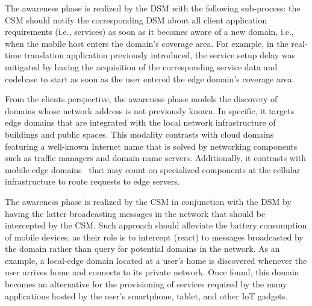The awareness phase is realized by the DSM with the following sub-process: the CSM should notify the corresponding DSM about all client application requirements (i.e., services) as soon as it becomes aware of a new domain, i.e., when the mobile host enters the domain's coverage area. For example, in the real-time translation application previously introduced, the service setup delay was mitigated by having the acquisition of the corresponding service data and codebase to start as soon as the user entered the edge domain's coverage area.

From the clients perspective, the awareness phase models the discovery of domains whose network address is not previously known. In specific, it targets edge domains that are integrated with the local network infrastructure of buildings and public spaces. This modality contrasts with cloud domains featuring a well-known Internet name that is solved by networking components such as traffic managers and domain-name servers. Additionally, it contrasts with mobile-edge domains~\cite{} that may count on specialized components at the cellular infrastructure to route requests to edge servers. 

The awareness phase is realized by the CSM in conjunction with the DSM by having the latter broadcasting messages in the network that should be intercepted by the CSM. 
Such approach should alleviate the battery consumption of mobile devices, as their role is to intercept (react) to messages broadcasted by the domain rather than query for potential domains in the network. As an example, a local-edge domain located at a user's home is discovered whenever the user arrives home and connects to its private network. Once found, this domain becomes an alternative for the provisioning of services required by the many applications hosted by the user's smartphone, tablet, and other IoT gadgets. %




